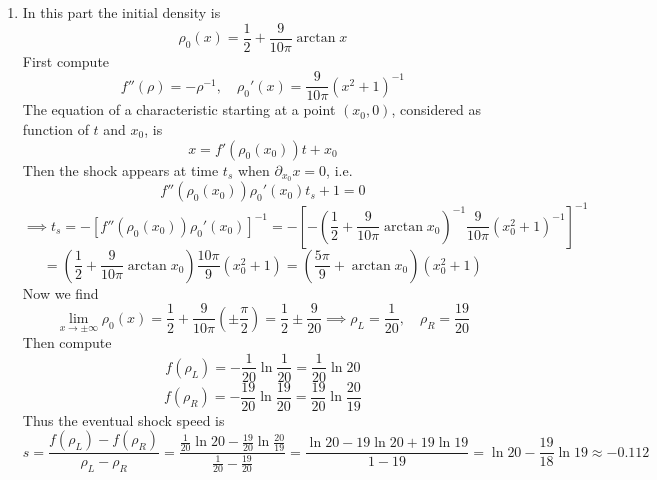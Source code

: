 \documentclass{article}
\newcommand{\br}[1]{\left(#1\right)}
\newcommand{\sbr}[1]{\left[#1\right]}
\newcommand{\inv}{^{-1}}
\newcommand{\imp}{\implies}
\newcommand{\ptl}{\partial}
\begin{document}
\begin{enumerate}[label=(\alph*)]
\item In this part the initial density is
$$\rho_0(x) = \frac12 + \frac{9}{10\pi}\arctan x$$
First compute
$$f''(\rho) = -\rho\inv,
\quad \rho_0'(x) = \frac{9}{10\pi}(x^2+1)\inv$$
The equation of a characteristic starting at a point $(x_0,0)$, considered as function of $t$ and $x_0$, is
$$x = f'(\rho_0(x_0))t + x_0$$
Then the shock appears at time $t_s$ when $\ptl_{x_0}x=0$, i.e.
$$f''(\rho_0(x_0))\rho_0'(x_0)t_s + 1 = 0$$
$$\imp t_s = -\sbr{f''(\rho_0(x_0))\rho_0'(x_0)}\inv
= -\sbr{-\br{\frac12 + \frac{9}{10\pi}\arctan x_0}\inv \frac{9}{10\pi}(x_0^2+1)\inv}\inv$$
$$= \br{\frac12 + \frac{9}{10\pi}\arctan x_0} \frac{10\pi}{9}(x_0^2+1)
= \br{\frac{5\pi}{9} + \arctan x_0}(x_0^2 + 1)$$
Now we find
$$\lim_{x\to\pm\infty}\rho_0(x) = \frac12 + \frac{9}{10\pi}\br{\pm\frac\pi2}
= \frac12 \pm \frac{9}{20}
\imp \rho_L = \frac{1}{20},
\quad \rho_R = \frac{19}{20}$$
Then compute
$$f(\rho_L) = -\frac{1}{20}\ln\frac{1}{20} = \frac{1}{20}\ln20$$
$$f(\rho_R) = -\frac{19}{20}\ln\frac{19}{20} = \frac{19}{20}\ln\frac{20}{19}$$
Thus the eventual shock speed is
$$s = \frac{f(\rho_L) - f(\rho_R)}{\rho_L - \rho_R}
= \frac{\frac{1}{20}\ln20 - \frac{19}{20}\ln\frac{20}{19}}{\frac{1}{20} - \frac{19}{20}}
= \frac{\ln20 - 19\ln20 + 19\ln19}{1 - 19}
= \ln20 - \frac{19}{18}\ln19
\approx -0.112$$

\end{enumerate}
\end{document}

